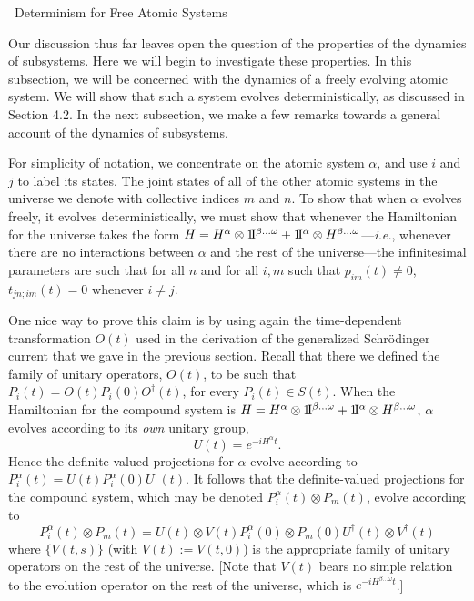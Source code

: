 \documentclass[12pt]{article}
\renewcommand{\subsection}[1]{\addtocounter{subsection}{1}
                           \setcounter{subsubsection}{0}
                           \vspace{20pt}
                           \begin{center}
                           \thesubsection \ #1
                           \end{center}
                           \vspace{20pt}}
\newcommand{\ie}{{\it i.e.}}         %
\newcommand{\ident}{1\!{\rm I}}                                 %
\newcommand{\ga}{\alpha}                                        %
\newcommand{\gb}{\beta}                                         %
\newcommand{\gw}{\omega}                                        %
\begin{document}
\vspace{-30pt}

\subsection{Determinism for Free Atomic Systems}


Our discussion thus far leaves open the question of the properties of 
the dynamics of subsystems.  Here we will begin to investigate these 
properties.  In this subsection, we will be concerned with the 
dynamics of a freely evolving atomic system.  We will show that such a 
system evolves deterministically, as discussed in Section 4.2.  In the 
next subsection, we make a few remarks towards a general account of 
the dynamics of subsystems.

For simplicity of notation, we concentrate on the atomic system $\ga$, 
and use $i$ and $j$ to label its states.  The joint states of all of 
the other atomic systems in the universe we denote with collective 
indices $m$ and $n$.  To show that when $\ga$ evolves freely, it 
evolves deterministically, we must show that whenever the Hamiltonian 
for the universe takes the form $H = H^{\ga} \otimes 
\ident^{\gb\ldots\gw} + \ident^{\ga} \otimes H^{\gb\ldots\gw}$---\ie, 
whenever there are no interactions between $\ga$ and the rest of the 
universe---the infinitesimal parameters are such that for all $n$ and 
for all $i, m$ such that $p_{im}(t) \neq 0$, $t_{jn;im}(t) = 0$ 
whenever $i \neq j$.

One nice way to prove this claim is by using again the time-dependent 
transformation $O(t)$ used in the derivation of the generalized 
Schr\"odinger current that we gave in the previous section.  Recall 
that there we defined the family of unitary operators, $O(t)$, to be 
such that $P_{i}(t) = O(t) P_{i}(0) O^{\dagger}(t)$, for every 
$P_{i}(t) \in S(t)$.  When the Hamiltonian for the compound system is 
$H = H^{\ga} \otimes \ident^{\gb\ldots\gw} +
\ident^{\ga} \otimes H^{\gb \ldots \gw}$, $\ga$ evolves according to
its {\it own} unitary group,
\begin{equation}
  \label{eq:gaop}
  U(t) = e^{-iH^{\ga}t}.
\end{equation}
Hence the definite-valued projections for $\ga$ evolve according to 
$P^{\ga}_{i}(t) = U(t) P^{\ga}_{i}(0) U^{\dagger}(t)$.  It follows 
that the definite-valued projections for the compound system, which 
may be denoted $P^{\ga}_{i}(t) \otimes P_{m}(t)$, evolve according to
\begin{equation}
  \label{eq:compoundev}
  P^{\ga}_{i}(t) \otimes P_{m}(t) = U(t) \otimes V(t) P^{\ga}_{i}(0)
  \otimes P_{m}(0) U^{\dagger}(t) \otimes V^{\dagger}(t)
\end{equation}
where $\{V(t,s)\}$ (with $V(t):=V(t,0)$) is the appropriate family of 
unitary operators on the rest of the universe.  [Note that $V(t)$ 
bears no simple relation to the evolution operator on the rest of the 
universe, which is $e^{-iH^{\gb\ldots\gw}t}$.]
\end{document}
